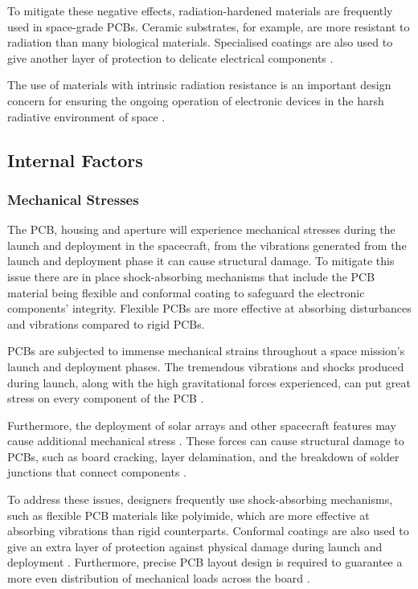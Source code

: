 To mitigate these negative effects, radiation-hardened materials are frequently 
used in space-grade PCBs. Ceramic substrates, for example, are more resistant to 
radiation than many biological materials. Specialised coatings are also used to 
give another layer of protection to delicate electrical components \cite{RefWorks:gatema2024challenges}.

The use of materials with intrinsic radiation resistance is an important design 
concern for ensuring the ongoing operation of electronic devices in the harsh 
radiative environment of space \cite{RefWorks:directory2025understanding}.

\subsection{Internal Factors}
\subsubsection{Mechanical Stresses}   
The PCB, housing and aperture will experience mechanical stresses during the launch 
and deployment in the spacecraft, from the vibrations generated from the launch and 
deployment phase it can cause structural damage. To mitigate this issue there are in 
place shock-absorbing mechanisms that include the PCB material being flexible and 
conformal coating to safeguard the electronic components' integrity. Flexible PCBs 
are more effective at absorbing disturbances and vibrations compared to rigid PCBs.

PCBs are subjected to immense mechanical strains throughout a space mission's launch 
and deployment phases. The tremendous vibrations and shocks produced during launch, 
along with the high gravitational forces experienced, can put great stress on every 
component of the PCB \cite{RefWorks:proto-electronics2024space-grade}.

Furthermore, the deployment of solar arrays and other spacecraft features may cause 
additional mechanical stress \cite{RefWorks:proto-electronics2024space-grade}. These forces can cause 
structural damage to PCBs, such as board cracking, layer delamination, and the 
breakdown of solder junctions that connect components \cite{RefWorks:proto-electronics2024space-grade}.

To address these issues, designers frequently use shock-absorbing mechanisms, such 
as flexible PCB materials like polyimide, which are more effective at absorbing 
vibrations than rigid counterparts. Conformal coatings are also used to give an 
extra layer of protection against physical damage during launch and deployment 
\cite{RefWorks:proto-electronics2024space-grade}. Furthermore, precise PCB layout design is required 
to guarantee a more even distribution of mechanical loads across the board 
\cite{RefWorks:proto-electronics2024space-grade}.

